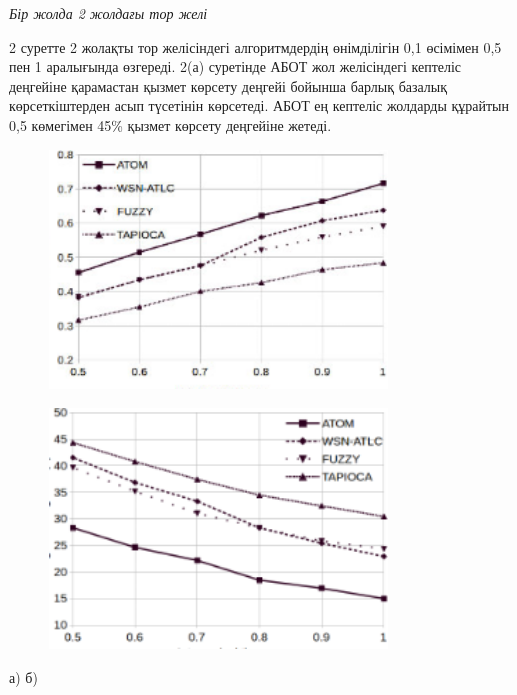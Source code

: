 \emph{Бір жолда 2 жолдағы тор желі}

2 суретте 2 жолақты тор желісіндегі алгоритмдердің өнімділігін 0,1
өсімімен 0,5 пен 1 \hspace{0pt}\hspace{0pt}аралығында өзгереді. 2(а)
суретінде АБОТ жол желісіндегі кептеліс деңгейіне қарамастан қызмет
көрсету деңгейі бойынша барлық базалық көрсеткіштерден асып түсетінін
көрсетеді. АБОТ ең кептеліс жолдарды құрайтын 0,5 көмегімен 45\% қызмет
көрсету деңгейіне жетеді.

\begin{figure}[H]
	\centering
	\includegraphics[width=0.8\textwidth]{assets/159}
	\caption*{}
\end{figure}
\begin{figure}[H]
	\centering
	\includegraphics[width=0.8\textwidth]{assets/160}
	\caption*{}
\end{figure}

а) б)

